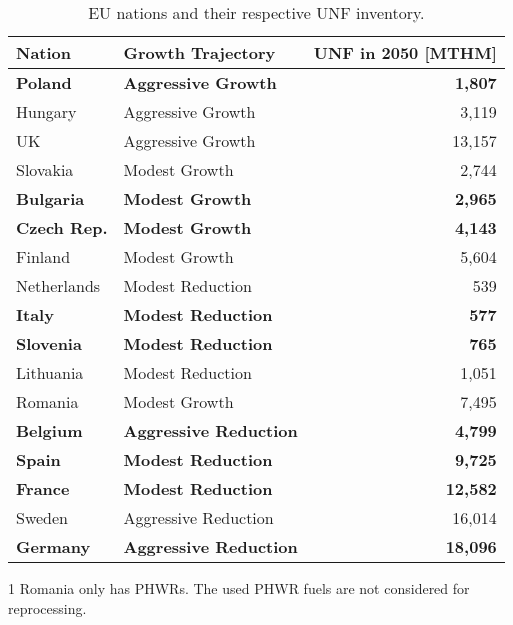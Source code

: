 \begin{table}[h]

\begin{threeparttable}
    \centering
    \caption {\gls{EU} nations and their respective \gls{UNF} inventory.} 
                \begin{tabularx}{\textwidth}{llr}
                    \hline 
                    \textbf{Nation} & \textbf{Growth Trajectory} & \small{\textbf{UNF in 2050 [MTHM] }}\\
                    \hline
                    \textbf{Poland} & \textbf{Aggressive Growth} & \textbf{1,807}\\
                    Hungary & Aggressive Growth & 3,119 \\ 
                    UK & Aggressive Growth & 13,157\\
                    Slovakia & Modest Growth & 2,744\\
                    \textbf{Bulgaria} & \textbf{Modest Growth} & \textbf{2,965} \\
                    \textbf{Czech Rep.} & \textbf{Modest Growth} & \textbf{4,143}\\
                    Finland & Modest Growth &  5,604\\
                    Netherlands & Modest Reduction & 539\\
                    \textbf{Italy} & \textbf{Modest Reduction} & \textbf{577}\\
                    \textbf{Slovenia} & \textbf{Modest Reduction} & \textbf{765}\\
                    Lithuania & Modest Reduction & 1,051 \\
                    Romania \tnote{1}  & Modest Growth & 7,495 \\
                    \textbf{Belgium} & \textbf{Aggressive Reduction} & \textbf{4,799}\\
                    \textbf{Spain} & \textbf{Modest Reduction} &  \textbf{9,725} \\
                    \textbf{France} & \textbf{Modest Reduction} & \textbf{12,582} \\
                    Sweden & Aggressive Reduction & 16,014\\
                    \textbf{Germany} & \textbf{Aggressive Reduction} & \textbf{18,096}\\
                    \hline
                \end{tabularx}
    \begin{tablenotes}
    \item[1] Romania only has \glspl{PHWR}. The used \gls{PHWR} fuels are not
             considered for reprocessing.
    \end{tablenotes}

    \label{tab:which_send}

\end{threeparttable}

\end{table}


